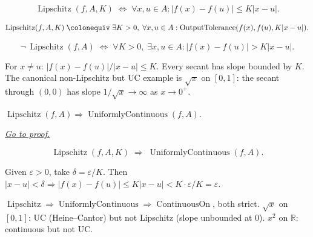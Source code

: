 \begin{remark*}
\[
  \operatorname{Lipschitz}(f,A,K)
  \;\iff\;
  \forall x,u\in A:|f(x)-f(u)|\leq K|x-u|.
\]
\end{remark*}

\begin{remark*}
\[
  \operatorname{Lipschitz}(f,A,K)
  \;\colonequiv\;
  \exists K>0,\;\forall x,u\in A:
  \operatorname{OutputTolerance}(f(x),f(u),K|x-u|).
\]
\end{remark*}

\begin{remark*}
\[
  \neg\,\operatorname{Lipschitz}(f,A)
  \;\iff\;
  \forall K>0,\;\exists x,u\in A:
  |f(x)-f(u)|>K|x-u|.
\]
\end{remark*}

\begin{remark*}
For $x\neq u$: $|f(x)-f(u)|/|x-u|\leq K$. Every secant has slope
bounded by $K$. The canonical non-Lipschitz but UC example is
$\sqrt{x}$ on $[0,1]$: the secant through $(0,0)$ has slope
$1/\sqrt{x}\to\infty$ as $x\to 0^+$.
\end{remark*}


\begin{proposition}
\label{prop:lipschitz-implies-uc}
$\operatorname{Lipschitz}(f,A)
\Rightarrow\operatorname{UniformlyContinuous}(f,A)$.

\smallskip\noindent
\hyperref[prf:lipschitz-implies-uniform-continuous]{\textit{Go to proof.}}
\end{proposition}

\begin{remark*}
\[
  \operatorname{Lipschitz}(f,A,K)
  \;\Rightarrow\;
  \operatorname{UniformlyContinuous}(f,A).
\]
\end{remark*}

\begin{remark*}
Given $\varepsilon>0$, take $\delta=\varepsilon/K$. Then
$|x-u|<\delta\Rightarrow|f(x)-f(u)|\leq K|x-u|<K\cdot\varepsilon/K=\varepsilon$.
\end{remark*}

\begin{remark*}
$\operatorname{Lipschitz}\Rightarrow\operatorname{UniformlyContinuous}
\Rightarrow\operatorname{ContinuousOn}$, both strict.
$\sqrt{x}$ on $[0,1]$: UC (Heine--Cantor) but not Lipschitz (slope
unbounded at $0$). $x^2$ on $\mathbb{R}$: continuous but not UC.
\end{remark*}

